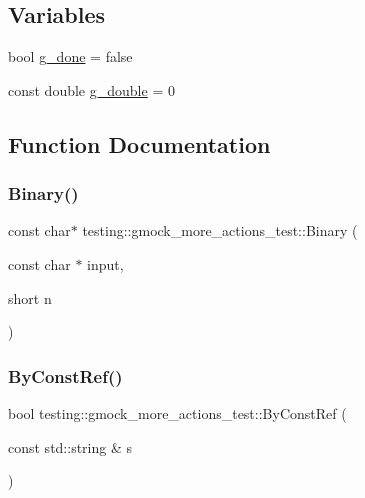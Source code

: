 \subsection*{Variables}
\begin{DoxyCompactItemize}
\item 
bool \mbox{\hyperlink{namespacetesting_1_1gmock__more__actions__test_ab2d168581c62c89bd00cdadcccd9e8e4}{g\+\_\+done}} = false
\item 
const double \mbox{\hyperlink{namespacetesting_1_1gmock__more__actions__test_a73552112032ff5d5900dd6f128a62718}{g\+\_\+double}} = 0
\end{DoxyCompactItemize}


\subsection{Function Documentation}
\mbox{\label{namespacetesting_1_1gmock__more__actions__test_a853c9f048674a60798b930750b74a1df}} 
\subsubsection{\texorpdfstring{Binary()}{Binary()}}
{\footnotesize\ttfamily const char$\ast$ testing\+::gmock\+\_\+more\+\_\+actions\+\_\+test\+::\+Binary (\begin{DoxyParamCaption}\item[{const char $\ast$}]{input,  }\item[{short}]{n }\end{DoxyParamCaption})}

\mbox{\label{namespacetesting_1_1gmock__more__actions__test_a38903b39cda75bfa5c932f4abec7a0ca}} 
\subsubsection{\texorpdfstring{ByConstRef()}{ByConstRef()}}
{\footnotesize\ttfamily bool testing\+::gmock\+\_\+more\+\_\+actions\+\_\+test\+::\+By\+Const\+Ref (\begin{DoxyParamCaption}\item[{const std\+::string \&}]{s }\end{DoxyParamCaption})}

